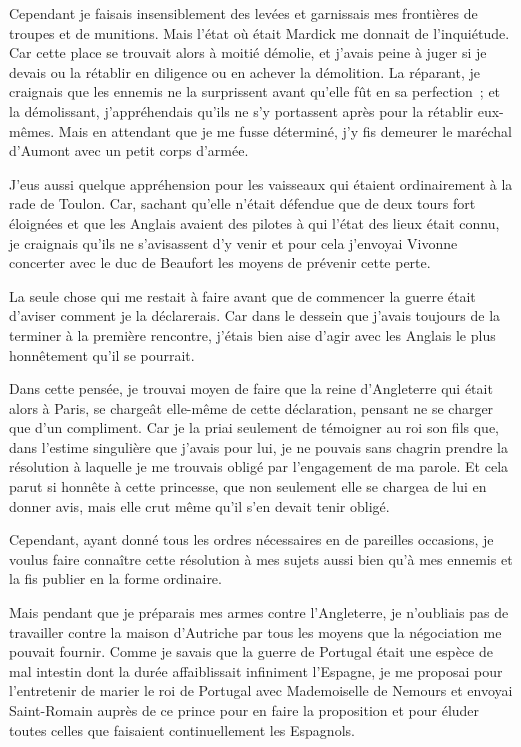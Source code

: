\documentclass[french,twoside]{book} %
\begin{document}
Cependant je faisais insensiblement des levées et garnissais mes frontières de troupes et de munitions. Mais l’état où était Mardick me donnait de l’inquiétude. Car cette place se trouvait alors à moitié démolie, et j’avais peine à juger si je devais ou la rétablir en diligence ou en achever la démolition. La réparant, je craignais que les ennemis ne la surprissent avant qu’elle fût en sa perfection ; et la démolissant, j’appréhendais qu’ils ne s’y portassent après pour la rétablir eux-mêmes. Mais en attendant que je me fusse déterminé, j’y fis demeurer le maréchal d’Aumont avec un petit corps d’armée.\par
J’eus aussi quelque appréhension pour les vaisseaux qui étaient ordinairement à la rade de Toulon. Car, sachant qu’elle n’était défendue que de deux tours fort éloignées et que les Anglais avaient des pilotes à qui l’état des lieux était connu, je craignais qu’ils ne s’avisassent d’y venir et pour cela j’envoyai Vivonne concerter avec le duc de Beaufort les moyens de prévenir cette perte.\par
La seule chose qui me restait à faire avant que de commencer la guerre était d’aviser comment je la déclarerais. Car dans le dessein que j’avais toujours de la terminer à la première rencontre, j’étais bien aise d’agir avec les Anglais le plus honnêtement qu’il se pourrait.\par
Dans cette pensée, je trouvai moyen de faire que la reine d’Angleterre qui était alors à Paris, se chargeât elle-même de cette déclaration, pensant ne se charger que d’un compliment. Car je la priai seulement de témoigner au roi son fils que, dans l’estime singulière que j’avais pour lui, je ne pouvais sans chagrin prendre la résolution à laquelle je me trouvais obligé par l’engagement de ma parole. Et cela parut si honnête à cette princesse, que non seulement elle se chargea de lui en donner avis, mais elle crut même qu’il s’en devait tenir obligé.\par
Cependant, ayant donné tous les ordres nécessaires en de pareilles occasions, je voulus faire connaître cette résolution à mes sujets aussi bien qu’à mes ennemis et la fis publier en la forme ordinaire.\par
Mais pendant que je préparais mes armes contre l’Angleterre, je n’oubliais pas de travailler contre la maison d’Autriche par tous les moyens que la négociation me pouvait fournir. Comme je savais que la guerre de Portugal était une espèce de mal intestin dont la durée affaiblissait infiniment l’Espagne, je me proposai pour l’entretenir de marier le roi de Portugal avec Mademoiselle de Nemours et envoyai Saint-Romain auprès de ce prince pour en faire la proposition et pour éluder toutes celles que faisaient continuellement les Espagnols.\par
\end{document}
